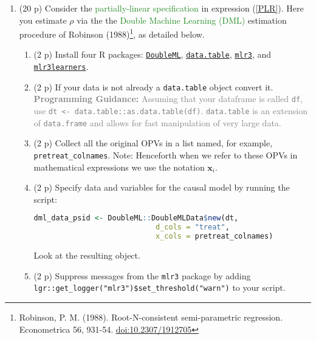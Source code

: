 \documentclass{article}
\begin{document}
\begin{enumerate}[label=\textbf{Q\arabic{enumi}}.,ref=Q\arabic{enumi}, wide=0pt, itemsep=0em, topsep=5pt, labelindent=0pt, resume]
\begin{enumerate}
\end{enumerate}



\item (20 p) Consider the \textcolor{ForestGreen}{partially-linear specification} in expression (\ref{PLR}). Here you estimate $\rho$ via the the \textcolor{ForestGreen}{Double Machine Learning (DML)} estimation procedure of Robinson (1988)\footnote{Robinson, P. M. (1988). Root-N-consistent semi-parametric regression. Econometrica 56, 931-54. \href{https://doi.org/10.2307/1912705}{doi:10.2307/1912705}}, as detailed below.\label{item:DML}
\begin{enumerate}
\item (2 p) Install four R packages: \href{https://docs.doubleml.org/stable/intro/install.html#r-installing-doubleml}{\texttt{DoubleML}}, \href{https://cran.r-project.org/web/packages/data.table/vignettes/datatable-intro.html}{\texttt{data.table}}, \href{https://mlr3.mlr-org.com/}{\texttt{mlr3}}, and \href{https://mlr3learners.mlr-org.com/}{\texttt{mlr3learners}}.
\item (2 p) If your data is not already a \texttt{data.table} object convert it. \textcolor{gray}{\textbf{Programming Guidance:} Assuming that your dataframe is called \texttt{df}, use \texttt{dt <- data.table::as.data.table(df)}. \texttt{data.table} is an extension of \texttt{data.frame} and allows for fast manipulation of very large data.}
\item (2 p) Collect all the original OPVs in a list named, for example, \texttt{pretreat\_colnames}. Note: Henceforth when we refer to these OPVs in mathematical expressions we use the notation $\mathbf{x}_{i}$.
\item (2 p) Specify data and variables for the causal model by running the script:\label{item:dml-data}
\begin{lstlisting}[language=R]
dml_data_psid <- DoubleML::DoubleMLData$new(dt,
                            d_cols = "treat",
                            x_cols = pretreat_colnames)
\end{lstlisting}
Look at the resulting object.
\item (2 p) Suppress messages from the \texttt{mlr3} package by adding \texttt{lgr::get\_logger("mlr3")\$set\_threshold("warn")} to your script.

\end{enumerate}
\end{enumerate}
\end{document}
